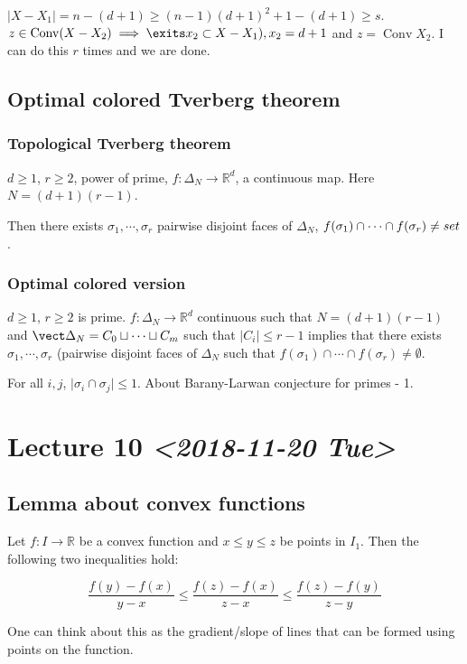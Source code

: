 \documentclass[11pt]{article}
\def\R{\mathbb{R}}
\def\conv{\operatorname{Conv}}
\begin{document}
\(\vert X - X_1 \vert = n - (d+1) \ge (n-1)(d+1)^2 + 1 - (d+1) \ge s\). \(z \in
    \conv(X - X_2) \implies \exits x_2 \subset X - X_1), x_2 = d+1\) and \(z =
    \conv X_2\). I can do this \(r\) times and we are done.
\subsection{Optimal colored Tverberg theorem}
\label{sec:orgbafb9d4}
\subsubsection{Topological Tverberg theorem}
\label{sec:org7266eaf}
\(d \ge 1\), \(r \ge 2\), power of prime, \(f \colon \Delta_N \rightarrow \R^d\),
a continuous map. Here \(N=(d+1)(r-1)\).

Then there exists \(\sigma_1, \cdots, \sigma_r\) pairwise disjoint faces of
\(\Delta_N\), \(f(\sigma_1) \cap \cdots \cap f(\sigma_r) \neq \empty set\).
\subsubsection{Optimal colored version}
\label{sec:org544e326}
\(d \ge 1\), \(r\ge 2\) is prime. \(f\colon \Delta_N \rightarrow \R^d\) continuous
such that \(N=(d+1)(r-1)\) and \(\vect \Delta_N = C_0 \sqcup \cdots \sqcup C_m\)
such that \(\vert C_i \vert \le r- 1\) implies that there exists \(\sigma_1,
    \cdots, \sigma_r\) (pairwise disjoint faces of \(\Delta_N\) such that
\(f(\sigma_1)\cap \cdots \cap f(\sigma_r) \neq \emptyset\).

For all \(i, j\), \(\vert \sigma_i \cap \sigma_j \vert \le 1\). About
Barany-Larwan conjecture for primes - 1.
\section{Lecture 10 \textit{<2018-11-20 Tue>}}
\label{sec:org836834b}
\subsection{Lemma about convex functions}
\label{sec:org0aa29d4}
Let \(f\colon I \rightarrow \R\) be a convex function and \(x \le y \le z\) be
points in \(I_1\). Then the following two inequalities hold: 

$$\frac{f(y) - f(x)}{y-x} \le \frac{f(z)-f(x)}{z-x} \le \frac{f(z) -
      f(y)}{z-y}$$

One can think about this as the gradient/slope of lines that can be formed
using points on the function.
\end{document}

